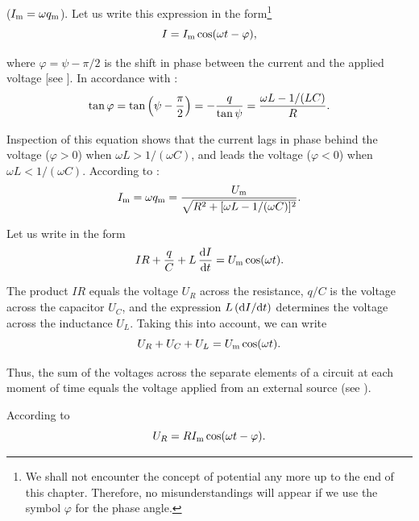 \noindent
($I_{\text{m}}=\omega q_{\text{m}}$).
Let us write this expression in the form\footnote{We shall not encounter the concept of potential any more up to the end of this chapter. Therefore, no misunderstandings will appear if we use the symbol $\varphi$ for the phase angle.}
\begin{equation}\label{eq:13_31}
    I = I_{\text{m}} \cos(\omega t - \varphi),
\end{equation}

\noindent
where $\varphi=\psi-\pi/2$ is the shift in phase between the current and the applied voltage [see ].
In accordance with :
\begin{equation}\label{eq:13_32}
    \tan\varphi = \tan\left(\psi - \frac{\pi}{2}\right) = - \frac{q}{\tan\psi} = \frac{\omega L - 1/(LC)}{R}.
\end{equation}

\noindent
Inspection of this equation shows that the current lags in phase behind the voltage ($\varphi>0$) when $\omega L>1/(\omega C)$, and leads the voltage ($\varphi<0$) when $\omega L<1/(\omega C)$.
According to :
\begin{equation}\label{eq:13_33}
    I_{\text{m}} = \omega q_{\text{m}} = \frac{U_{\text{m}}}{\sqrt{R^2 + [\omega L - 1/(\omega C)]^2}}.
\end{equation}

\noindent
Let us write  in the form
\begin{equation}\label{eq:13_34}
    IR + \frac{q}{C} + L\, \dfrac{\mathrm{d} I}{\mathrm{d} t} = U_{\text{m}} \cos(\omega t).
\end{equation}

\noindent
The product $IR$ equals the voltage $U_R$ across the resistance, $q/C$ is the voltage across the capacitor $U_C$, and the expression $L\,(\mathrm{d} I/\mathrm{d} t)$ determines the voltage across the inductance $U_L$.
Taking this into account, we can write
\begin{equation}\label{eq:13_35}
    U_R + U_C + U_L = U_{\text{m}} \cos(\omega t).
\end{equation}

\noindent
Thus, the sum of the voltages across the separate elements of a circuit at each moment of time equals the voltage applied from an external source (see ).

According to 
\begin{equation}\label{eq:13_36}
    U_R = R I_{\text{m}} \cos(\omega t - \varphi).
\end{equation}

